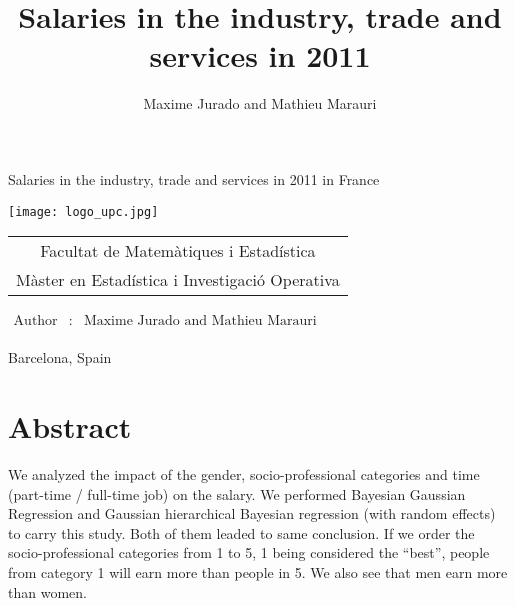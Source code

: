 \documentclass[]{article}
\title{Salaries in the industry, trade and services in 2011}
\author{Maxime Jurado and Mathieu Marauri}
\date{}
\begin{document}
\begin{titlepage}

\mbox{}
\begin{center}
\Huge{Salaries in the industry, trade and services in 2011 in France}
\end{center}
\vspace*{1 in}

\vspace*{2cm}\mbox{}

\begin{center}
\texttt{[image: logo\_upc.jpg]}
\end{center}
\smallskip
\begin{center}
\Large
\begin{tabular}{c}
\sc Facultat de Matem\`atiques i Estad\'istica\\
\sc M\`aster en Estad\'istica i Investigaci\'o Operativa \\

\end{tabular}
\normalsize
\end{center}
\smallskip

\vspace{3cm}

\large
  \begin{flushright}
    \vspace*{1cm}\mbox{}
$
\begin{array}{lcl}
\mbox{Author} &:& \mbox{Maxime Jurado and Mathieu Marauri}\\
\end{array}
$
\end{flushright}

\vspace*{0.5 in}

\begin{center}
Barcelona, Spain
\end{center}
\normalsize
\end{titlepage}

\newpage


{
\hypersetup{linkcolor=black}
\setcounter{tocdepth}{2}
\tableofcontents
}
\newpage

\section{Abstract}\label{abstract}

We analyzed the impact of the gender, socio-professional categories and
time (part-time / full-time job) on the salary. We performed Bayesian
Gaussian Regression and Gaussian hierarchical Bayesian regression (with
random effects) to carry this study. Both of them leaded to same
conclusion. If we order the socio-professional categories from 1 to 5, 1
being considered the ``best'', people from category 1 will earn more
than people in 5. We also see that men earn more than women.
\end{document}
